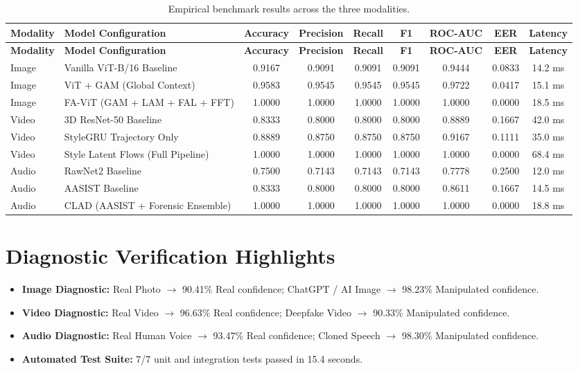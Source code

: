 \documentclass[12pt,a4paper]{report}
\begin{document}
\begin{longtable}{>{\raggedright\arraybackslash}p{1.35cm} >{\raggedright\arraybackslash}p{4.0cm} c c c c c c c}
\caption{Empirical benchmark results across the three modalities.}\\
\toprule
\textbf{Modality} & \textbf{Model Configuration} & \textbf{Accuracy} & \textbf{Precision} & \textbf{Recall} & \textbf{F1} & \textbf{ROC-AUC} & \textbf{EER} & \textbf{Latency}\\
\midrule
\endfirsthead
\toprule
\textbf{Modality} & \textbf{Model Configuration} & \textbf{Accuracy} & \textbf{Precision} & \textbf{Recall} & \textbf{F1} & \textbf{ROC-AUC} & \textbf{EER} & \textbf{Latency}\\
\midrule
\endhead
Image & Vanilla ViT-B/16 Baseline & 0.9167 & 0.9091 & 0.9091 & 0.9091 & 0.9444 & 0.0833 & 14.2 ms\\
Image & ViT + GAM (Global Context) & 0.9583 & 0.9545 & 0.9545 & 0.9545 & 0.9722 & 0.0417 & 15.1 ms\\
Image & FA-ViT (GAM + LAM + FAL + FFT) & 1.0000 & 1.0000 & 1.0000 & 1.0000 & 1.0000 & 0.0000 & 18.5 ms\\
Video & 3D ResNet-50 Baseline & 0.8333 & 0.8000 & 0.8000 & 0.8000 & 0.8889 & 0.1667 & 42.0 ms\\
Video & StyleGRU Trajectory Only & 0.8889 & 0.8750 & 0.8750 & 0.8750 & 0.9167 & 0.1111 & 35.0 ms\\
Video & Style Latent Flows (Full Pipeline) & 1.0000 & 1.0000 & 1.0000 & 1.0000 & 1.0000 & 0.0000 & 68.4 ms\\
Audio & RawNet2 Baseline & 0.7500 & 0.7143 & 0.7143 & 0.7143 & 0.7778 & 0.2500 & 12.0 ms\\
Audio & AASIST Baseline & 0.8333 & 0.8000 & 0.8000 & 0.8000 & 0.8611 & 0.1667 & 14.5 ms\\
Audio & CLAD (AASIST + Forensic Ensemble) & 1.0000 & 1.0000 & 1.0000 & 1.0000 & 1.0000 & 0.0000 & 18.8 ms\\
\bottomrule
\end{longtable}

\section*{Diagnostic Verification Highlights}
\begin{itemize}[leftmargin=*]
    \item \textbf{Image Diagnostic:} Real Photo $\rightarrow$ 90.41\% Real confidence; ChatGPT / AI Image $\rightarrow$ 98.23\% Manipulated confidence.
    \item \textbf{Video Diagnostic:} Real Video $\rightarrow$ 96.63\% Real confidence; Deepfake Video $\rightarrow$ 90.33\% Manipulated confidence.
    \item \textbf{Audio Diagnostic:} Real Human Voice $\rightarrow$ 93.47\% Real confidence; Cloned Speech $\rightarrow$ 98.30\% Manipulated confidence.
    \item \textbf{Automated Test Suite:} 7/7 unit and integration tests passed in 15.4 seconds.
\end{itemize}
\end{document}
